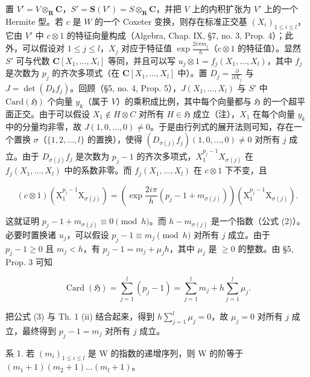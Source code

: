 置 \(V' = V \otimes_{\mathbf{R}} \mathbf{C}\)，\(S' = \mathbf{S}(V') = S \otimes_{\mathbf{R}} \mathbf{C}\)，并把 \(V\) 上的内积扩张为 \(V'\) 上的一个 Hermite 型。若 \(c\) 是 \(W\) 的一个 Coxeter 变换，则存在标准正交基 \((X_i)_{1 \leqslant i \leqslant l}\)，它由 \(V'\) 中 \(c \otimes 1\) 的特征向量构成（Algebra, Chap. IX, §7, no. 3, Prop. 4）；此外，可以假设对 \(1 \leqslant j \leqslant l\)，\(X_j\) 对应于特征值 \(\exp \frac{2i\pi m_j}{h}\)（\(c \otimes 1\) 的特征值）。显然 \(S'\) 可与代数 \(\mathbf{C}[X_1, \ldots, X_l]\) 等同，并且可以写 \(u_j \otimes 1 = f_j(X_1, \ldots, X_l)\)，其中 \(f_j\) 是次数为 \(p_j\) 的齐次多项式（在 \(\mathbf{C}[X_1, \ldots, X_l]\) 中）。置 \(D_j = \frac{\partial}{\partial X_j}\) 与 \(J = \det(D_k f_j)\)。回顾（§5, no. 4, Prop. 5），\(J(X_1, \ldots, X_l)\) 与 \(S'\) 中 \(\text{Card}(\mathfrak{H})\) 个向量 \(y_k\)（属于 \(V\)）的乘积成比例，其中每个向量都与 \(\mathfrak{H}\) 的一个超平面正交。由于可以假设 \(X_1 \notin H \otimes C\) 对所有 \(H \in \mathfrak{H}\) 成立（注），\(X_1\) 在每个向量 \(y_k\) 中的分量均非零，故 \(J(1, 0, \ldots, 0) \neq 0\)。于是由行列式的展开法则可知，存在一个置换 \(\sigma\)（\(\{1, 2, \ldots, l\}\) 的置换），使得 \((D_{\sigma(j)} f_j)(1, 0, \ldots, 0) \neq 0\) 对所有 \(j\) 成立。由于 \(D_{\sigma(j)} f_j\) 是次数为 \(p_j - 1\) 的齐次多项式，\(X_1^{p_j - 1} X_{\sigma(j)}\) 在 \(f_j(X_1, \ldots, X_l)\) 中的系数非零。而 \(f_j(X_1, \ldots, X_l)\) 在 \(c \otimes 1\) 下不变，且

\[
(c \otimes 1) (\mathrm{X} _ {1} ^ {p _ {j} - 1} \mathrm{X} _ {\sigma (j)}) = \left(\exp \frac {2 i \pi}{h} (p _ {j} - 1 + m _ {\sigma (j)})\right) (\mathrm{X} _ {1} ^ {p _ {j} - 1} \mathrm{X} _ {\sigma (j)}).
\]

这就证明 \(p_j - 1 + m_{\sigma(j)} \equiv 0 \pmod{h}\)。而 \(h - m_{\sigma(j)}\) 是一个指数（公式 (2)）。必要时置换诸 \(u_j\)，可以假设 \(p_j - 1 \equiv m_j \pmod{h}\) 对所有 \(j\) 成立。由于 \(p_j - 1 \geqslant 0\) 且 \(m_j < h\)，有 \(p_j - 1 = m_j + \mu_j h\)，其中 \(\mu_j\) 是 \(\geqslant 0\) 的整数。由 §5, Prop. 3 可知

\[
\operatorname{Card} (\mathfrak {H}) = \sum_ {j = 1} ^ {l} (p _ {j} - 1) = \sum_ {j = 1} ^ {l} m _ {j} + h \sum_ {j = 1} ^ {l} \mu_ {j}.
\]

把公式 (3) 与 Th. 1 (ii) 结合起来，得到 \(h \sum_{j=1}^{l} \mu_j = 0\)，故 \(\mu_j = 0\) 对所有 \(j\) 成立，最终得到 \(p_j - 1 = m_j\) 对所有 \(j\) 成立。

系 1. 若 \((m_i)_{1\leqslant i\leqslant l}\) 是 W 的指数的递增序列，则 W 的阶等于 \((m_1 + 1)(m_2 + 1)\ldots (m_l + 1)\)。

